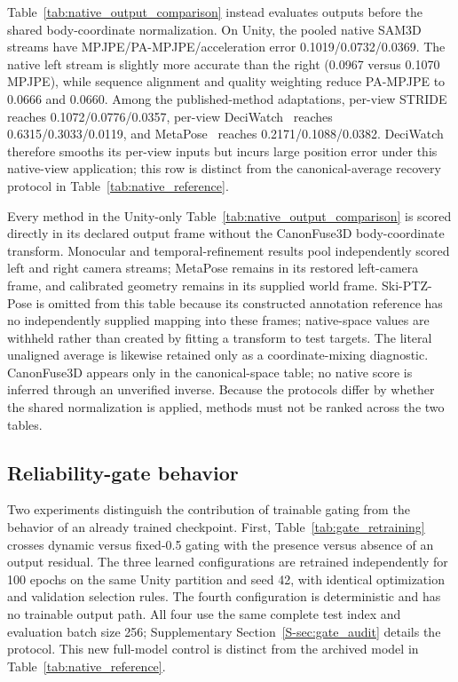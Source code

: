 \documentclass[preprint,12pt]{elsarticle}
\begin{document}



Table~\ref{tab:native_output_comparison} instead evaluates outputs before the shared body-coordinate normalization. On Unity, the pooled native SAM3D streams have MPJPE/PA-MPJPE/acceleration error 0.1019/0.0732/0.0369. The native left stream is slightly more accurate than the right (0.0967 versus 0.1070 MPJPE), while sequence alignment and quality weighting reduce PA-MPJPE to 0.0666 and 0.0660. Among the published-method adaptations, per-view STRIDE~\cite{lal2025stride} reaches 0.1072/0.0776/0.0357, per-view DeciWatch~\cite{zeng2022deciwatch} reaches 0.6315/0.3033/0.0119, and MetaPose~\cite{usman2022metapose} reaches 0.2171/0.1088/0.0382. DeciWatch therefore smooths its per-view inputs but incurs large position error under this native-view application; this row is distinct from the canonical-average recovery protocol in Table~\ref{tab:native_reference}.

Every method in the Unity-only Table~\ref{tab:native_output_comparison} is scored directly in its declared output frame without the CanonFuse3D body-coordinate transform. Monocular and temporal-refinement results pool independently scored left and right camera streams; MetaPose remains in its restored left-camera frame, and calibrated geometry remains in its supplied world frame. Ski-PTZ-Pose is omitted from this table because its constructed annotation reference has no independently supplied mapping into these frames; native-space values are withheld rather than created by fitting a transform to test targets. The literal unaligned average is likewise retained only as a coordinate-mixing diagnostic. CanonFuse3D appears only in the canonical-space table; no native score is inferred through an unverified inverse. Because the protocols differ by whether the shared normalization is applied, methods must not be ranked across the two tables.

\FloatBarrier
\subsection{Reliability-gate behavior}

Two experiments distinguish the contribution of trainable gating from the behavior of an already trained checkpoint. First, Table~\ref{tab:gate_retraining} crosses dynamic versus fixed-0.5 gating with the presence versus absence of an output residual. The three learned configurations are retrained independently for 100 epochs on the same Unity partition and seed 42, with identical optimization and validation selection rules. The fourth configuration is deterministic and has no trainable output path. All four use the same complete test index and evaluation batch size 256; Supplementary Section~\ref{S-sec:gate_audit} details the protocol. This new full-model control is distinct from the archived model in Table~\ref{tab:native_reference}.
\end{document}
